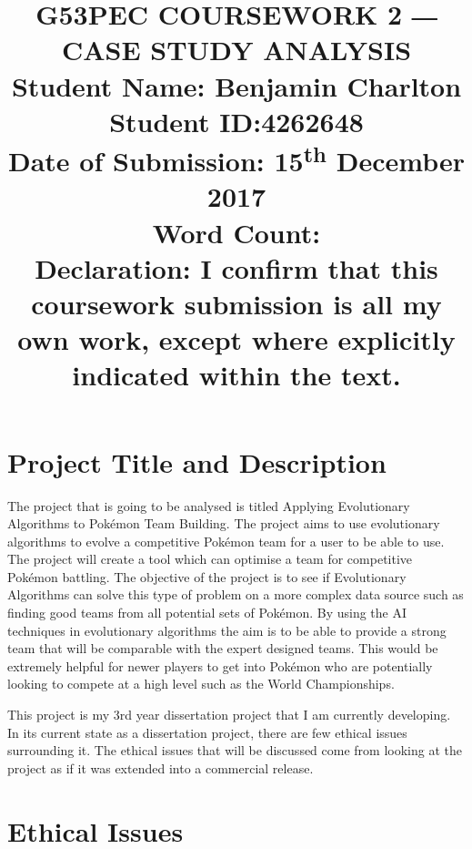 \documentclass[a4paper]{article}
\newcommand{\Pokemon}{Pok\'{e}mon}
\begin{document}
\title{
    G53PEC COURSEWORK 2 ― CASE STUDY ANALYSIS \\
    \large{Student Name: Benjamin Charlton \\
            Student ID:\@ 4262648 \\
            Date of Submission: 15\textsuperscript{th} December 2017\\
            Word Count: \\
            Declaration: I confirm that this coursework submission is all my own work, except where explicitly indicated within the text.}
    \date{}}
\maketitle

\section{Project Title and Description}
The project that is going to be analysed is titled Applying Evolutionary Algorithms to \Pokemon{} Team Building.
The project aims to use evolutionary algorithms to evolve a competitive \Pokemon{} team for a user to be able to use.
The project will create a tool which can optimise a team for competitive Pokémon battling.
The objective of the project is to see if Evolutionary Algorithms can solve this type of problem on a more complex data source such as finding good teams from all potential sets of Pokémon.
By using the AI techniques in evolutionary algorithms the aim is to be able to provide a strong team that will be comparable with the expert designed teams.
This would be extremely helpful for newer players to get into \Pokemon{} who are potentially looking to compete at a high level such as the World Championships\cite{worldsOverview}.
\par
This project is my 3rd year dissertation project that I am currently developing.
In its current state as a dissertation project, there are few ethical issues surrounding it.
The ethical issues that will be discussed come from looking at the project as if it was extended into a commercial release.

\section{Ethical Issues}
\end{document}
